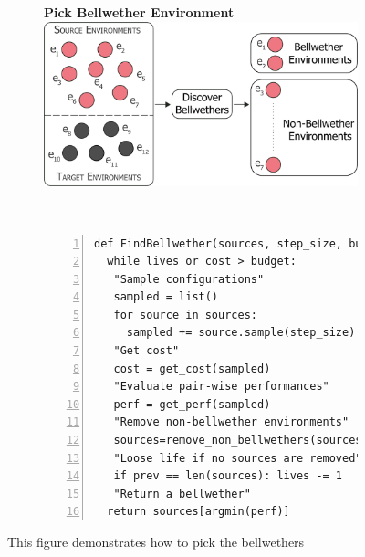 \begin{figure}[t]
\centering
\begin{subfigure}[t]{\linewidth}
\centering
\textbf{Pick Bellwether Environment}\\[0.1cm]
\includegraphics[width=\linewidth]{figures/source_target.png}
\end{subfigure}\\
\begin{subfigure}[t]{\linewidth}
\vspace{0.5cm}
\small
\begin{lstlisting}[xleftmargin=4.0ex,mathescape,frame=none,numbers=left]
def FindBellwether(sources, step_size, budget, thres, lives): 
  while lives or cost > budget:
   "Sample configurations"
   sampled = list()
   for source in sources:
     sampled += source.sample(step_size)
   "Get cost"
   cost = get_cost(sampled)
   "Evaluate pair-wise performances"
   perf = get_perf(sampled)
   "Remove non-bellwether environments"
   sources=remove_non_bellwethers(sources, perf, thres)
   "Loose life if no sources are removed"
   if prev == len(sources): lives -= 1
   "Return a bellwether"
  return sources[argmin(perf)]
\end{lstlisting}
\end{subfigure}
\caption{{\small This figure demonstrates how to pick the bellwethers}}
\label{fig:approach_a}
\end{figure}

